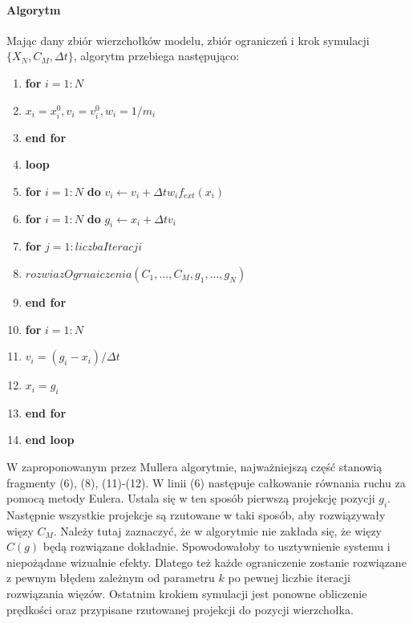 \paragraph{Algorytm}

Mając dany zbiór wierzchołków modelu, zbiór ograniczeń i krok symulacji $\{X_N,
	C_M, \Delta t \}$, algorytm przebiega następująco:
\begin{enumerate}
\item \textbf{for} $i = 1:N$
\item \hspace{1cm} $x_i = x_i^0, v_i = v_i^0, w_i = 1/m_i$
\item \textbf{end for}
\item \textbf{loop}
\item \hspace{1cm} \textbf{for} $i = 1:N$ \textbf{do} $v_i \leftarrow v_i + \Delta t w_i f_{ext}(x_i)$
\item \hspace{1cm} \textbf{for} $i = 1:N$ \textbf{do} $g_i \leftarrow x_i + \Delta t v_i$
\item \hspace{1cm} \textbf{for} $j = 1:liczbaIteracji$
\item \hspace{2cm} $rozwiazOgrnaiczenia(C_1,..., C_{M}, g_1, ..., g_N)$
\item \hspace{1cm} \textbf{end for}
\item \hspace{1cm} \textbf{for} $i = 1:N$
\item \hspace{2cm} $v_i = (g_i - x_i) / \Delta t$
\item \hspace{2cm} $x_i = g_i$
\item \hspace{1cm}\textbf{end for}
\item \textbf{end loop}

\end{enumerate}

W zaproponowanym przez Mullera algorytmie, najważniejszą część stanowią
fragmenty (6), (8), (11)-(12). W linii (6) następuje całkowanie równania ruchu za 
pomocą metody Eulera. Ustala się w ten sposób pierwszą projekcję pozycji $g_i$. Następnie
wszystkie projekcje są rzutowane w taki sposób, aby rozwiązywały 
więzy $C_M$. Należy tutaj zaznaczyć, że w algorytmie nie zakłada się, że
więzy $C(g)$ będą rozwiązane dokładnie. Spowodowałoby to 
usztywnienie systemu i niepożądane wizualnie efekty. Dlatego też każde
ograniczenie zostanie rozwiązane z pewnym błędem zależnym od parametru $k$ po
pewnej liczbie iteracji rozwiązania więzów.
Ostatnim krokiem symulacji jest ponowne obliczenie
prędkości oraz przypisane rzutowanej projekcji do pozycji wierzchołka.

